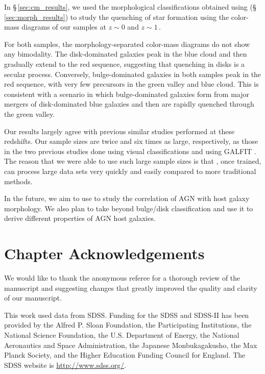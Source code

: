 In \S\,\ref{sec:cm_results}, we used the morphological classifications obtained using \gamornet{} (\S\,\ref{sec:morph_results}) to study the quenching of star formation using the color-mass diagrams of our samples at $z\sim0$ and $z\sim1$\,.

For both samples, the morphology-separated color-mass diagrams do not show any bimodality. The disk-dominated galaxies peak in the blue cloud and then gradually extend to the red sequence, suggesting that quenching in disks is a secular process. Conversely, bulge-dominated galaxies in both samples peak  in  the  red  sequence,  with  very few precursors in the green valley and blue cloud. This is consistent with a scenario in which bulge-dominated galaxies form from major mergers of disk-dominated blue galaxies and then are rapidly quenched through the green valley.

Our results largely agree with previous similar studies performed at these redshifts. Our sample sizes are twice and six times as large, respectively, as those in the two previous studies done using visual classifications \citep{schawinski_14_green_herring} and using GALFIT \citep{powell_17}. The reason that we were able to use such large sample sizes is that \gamornet{}, once trained, can process large data sets very quickly and easily compared to more traditional methods.

In the future, we aim to use \gamornet{} to study the correlation of AGN with host galaxy morphology. We also plan to take \gamornet{} beyond bulge/disk classification and use it to derive different properties of AGN host galaxies. 

\section*{Chapter Acknowledgements}
We would like to thank the anonymous referee for a thorough review of the manuscript and suggesting changes that greatly improved the quality and clarity of our manuscript.

This work used data from SDSS. Funding for the SDSS and SDSS-II has been provided by the Alfred P. Sloan Foundation, the Participating Institutions, the National Science Foundation, the U.S. Department of Energy, the National Aeronautics and Space Administration, the Japanese Monbukagakusho, the Max Planck Society, and the Higher Education Funding Council for England. The SDSS website is \href{http://www.sdss.org/}{http://www.sdss.org/}.

